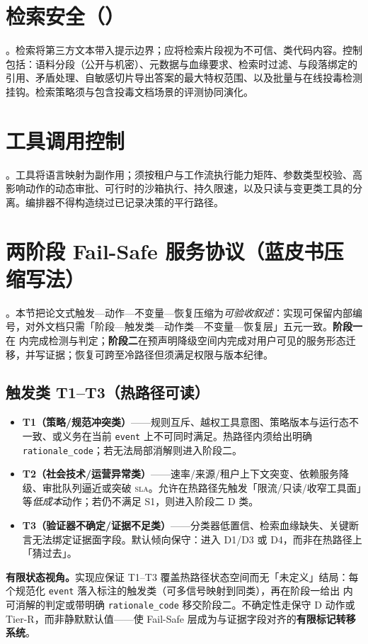\documentclass[11pt,a4paper]{report}
\begin{document}
\section{检索安全（\RAG{}）}
\ControlPlane{}。检索将第三方文本带入提示边界；应将检索片段视为不可信、类代码内容。控制包括：语料分段（公开与机密）、元数据与血缘要求、检索时过滤、与段落绑定的引用、矛盾处理、自敏感切片导出答案的最大特权范围、以及批量与在线投毒检测挂钩。检索策略须与包含投毒文档场景的评测协同演化。

\section{工具调用控制}
\ControlPlane{}。工具将语言映射为副作用；须按租户与工作流执行能力矩阵、参数类型校验、高影响动作的动态审批、可行时的沙箱执行、持久限速，以及只读与变更类工具的分离。编排器不得构造绕过已记录决策的平行路径。

\section{两阶段 Fail-Safe 服务协议（蓝皮书压缩写法）}
\DecoupledSafety{}。本节把论文式触发—动作—不变量—恢复压缩为\emph{可验收叙述}：实现可保留内部编号，对外文档只需「阶段—触发类—动作类—不变量—恢复层」五元一致。\textbf{阶段一}在 \SafetyKernel{} 内完成检测与判定；\textbf{阶段二}在预声明降级空间内完成对用户可见的服务形态迁移，并写证据；恢复可跨至冷路径但须满足权限与版本纪律。

\subsection{触发类 T1--T3（热路径可读）}
\begin{itemize}
  \item \textbf{T1（策略/规范冲突类）}——规则互斥、越权工具意图、策略版本与运行态不一致、或义务在当前 \texttt{event} 上不可同时满足。热路径内须给出明确 \texttt{rationale\_code}；若无法局部消解则进入阶段二。
  \item \textbf{T2（社会技术/运营异常类）}——速率/来源/租户上下文突变、依赖服务降级、审批队列逼近或突破 \textsc{sla}。允许在热路径先触发「限流/只读/收窄工具面」等\emph{低成本}动作；若仍不满足 S1，则进入阶段二 D 类。
  \item \textbf{T3（验证器不确定/证据不足类）}——分类器低置信、检索血缘缺失、关键断言无法绑定证据面字段。默认倾向保守：进入 D1/D3 或 D4，而非在热路径上「猜过去」。
\end{itemize}

\noindent\textbf{有限状态视角。}实现应保证 T1--T3 覆盖热路径状态空间而无「未定义」结局：每个规范化 \texttt{event} 落入标注的触发类（可多信号映射到同类），再在阶段一给出 \SafetyKernel{} 内可消解的判定或带明确 \texttt{rationale\_code} 移交阶段二。不确定性走保守 D 动作或 Tier-R，而非静默默认值——使 Fail-Safe 层成为与证据字段对齐的\textbf{有限标记转移系统}。
\end{document}
